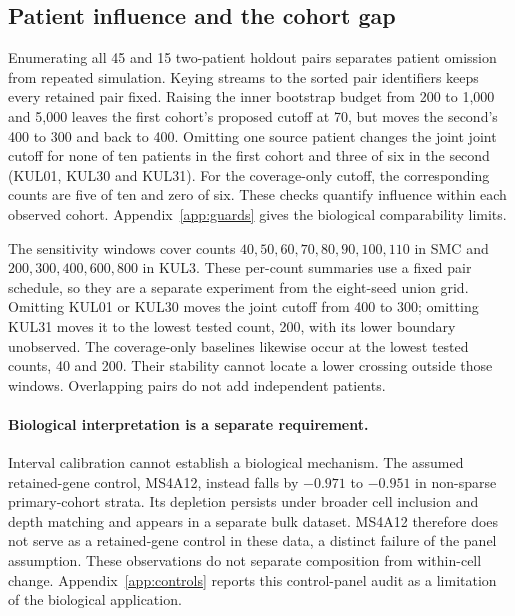 \subsection{Patient influence and the cohort gap}
Enumerating all 45 and 15 two-patient holdout pairs separates patient omission
from repeated simulation. Keying streams to the sorted pair identifiers keeps
every retained pair fixed. Raising the inner bootstrap budget from 200 to 1{,}000
and 5{,}000 leaves the first cohort's proposed cutoff at 70, but moves the second's
400 to 300 and back to 400. Omitting one source patient changes the joint
joint cutoff for none of ten patients in the first
cohort and three of six in the second (KUL01, KUL30 and KUL31). For the
coverage-only cutoff, the corresponding counts are five of ten and zero of
six. These checks quantify influence within each observed cohort.
Appendix~\ref{app:guards} gives the biological comparability limits.


The sensitivity windows cover counts $40,50,60,70,80,90,100,110$ in SMC and
$200,300,400,600,800$ in KUL3. These per-count summaries use a fixed pair
schedule, so they are a separate experiment from the eight-seed union grid.
Omitting KUL01 or KUL30 moves the joint cutoff from 400 to 300; omitting
KUL31 moves it to the lowest tested count, 200, with its lower boundary
unobserved. The coverage-only baselines likewise occur at the lowest tested
counts, 40 and 200. Their stability cannot locate a lower crossing outside
those windows. Overlapping pairs do not add independent patients.




\paragraph{Biological interpretation is a separate requirement.}\label{sec:biocontrols}
Interval calibration cannot establish a biological mechanism. The assumed
retained-gene control, MS4A12, instead falls by $-0.971$ to $-0.951$ in
non-sparse primary-cohort strata. Its depletion persists under broader cell
inclusion and depth matching and appears in a separate bulk dataset.
MS4A12 therefore does not serve as a retained-gene control in these data,
a distinct failure of the panel assumption. These observations do not separate
composition from within-cell change. Appendix~\ref{app:controls} reports this
control-panel audit as a limitation of the biological application.
